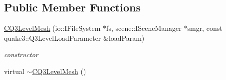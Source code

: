 \subsection*{Public Member Functions}
\begin{DoxyCompactItemize}
\item 
\hypertarget{classirr_1_1scene_1_1_c_q3_level_mesh_a8662f8649cd36d54c49a50fc6ce10a97}{\hyperlink{classirr_1_1scene_1_1_c_q3_level_mesh_a8662f8649cd36d54c49a50fc6ce10a97}{C\-Q3\-Level\-Mesh} (io\-::\-I\-File\-System $\ast$fs, scene\-::\-I\-Scene\-Manager $\ast$smgr, const quake3\-::\-Q3\-Level\-Load\-Parameter \&load\-Param)}\label{classirr_1_1scene_1_1_c_q3_level_mesh_a8662f8649cd36d54c49a50fc6ce10a97}

\begin{DoxyCompactList}\small\item\em constructor \end{DoxyCompactList}\item 
\hypertarget{classirr_1_1scene_1_1_c_q3_level_mesh_aa555f0b7864cb177a46df4b158147431}{virtual \hyperlink{classirr_1_1scene_1_1_c_q3_level_mesh_aa555f0b7864cb177a46df4b158147431}{$\sim$\-C\-Q3\-Level\-Mesh} ()}\label{classirr_1_1scene_1_1_c_q3_level_mesh_aa555f0b7864cb177a46df4b158147431}


\end{DoxyCompactItemize}
